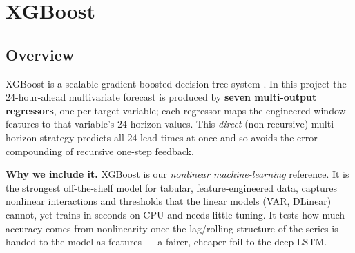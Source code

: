 \documentclass[12pt,a4paper,oneside]{report}
\begin{document}
\section{XGBoost}
\label{sec:xgboost}

\subsection{Overview}
\label{sec:xgb-overview}
XGBoost is a scalable gradient-boosted decision-tree system \citep{chen2016xgboost}.
In this project the $24$-hour-ahead multivariate forecast is produced by
\textbf{seven multi-output regressors}, one per target variable; each regressor
maps the engineered window features to that variable's $24$ horizon values. This
\emph{direct} (non-recursive) multi-horizon strategy predicts all $24$ lead times
at once and so avoids the error compounding of recursive one-step feedback.

\textbf{Why we include it.} XGBoost is our \emph{nonlinear machine-learning}
reference. It is the strongest off-the-shelf model for tabular, feature-engineered
data, captures nonlinear interactions and thresholds that the linear models
(VAR, DLinear) cannot, yet trains in seconds on CPU and needs little tuning. It
tests how much accuracy comes from nonlinearity once the lag/rolling structure of
the series is handed to the model as features --- a fairer, cheaper foil to the
deep LSTM.
\end{document}
